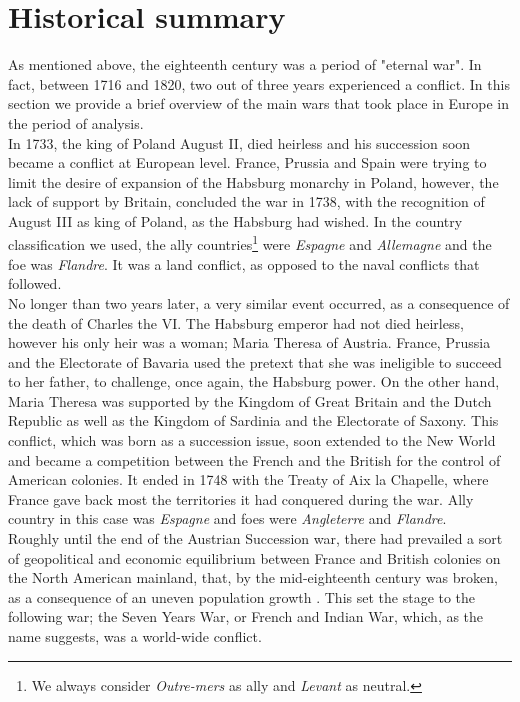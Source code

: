 \documentclass[12pt,a4paper,notitlepage,english]{article}
\begin{document}
\section{Historical summary} \label{historical_summary}
As mentioned above, the eighteenth century was a period of "eternal war".
In fact, between 1716 and 1820, two out of three years experienced a conflict.
In this section we provide a brief overview of the main wars that took place in Europe in the period of analysis. \\
In 1733, the king of Poland August II, died heirless and his succession soon became a conflict at European level.
France, Prussia and Spain were trying to limit the desire of expansion of the Habsburg monarchy in Poland, however, the lack of support by Britain, concluded the war in 1738, with the recognition of August III as king of Poland, as the Habsburg had wished.
In the country classification we used, the ally countries\footnote{We always consider \textit{Outre-mers} as ally and \textit{Levant} as neutral.} were \textit{Espagne} and \textit{Allemagne} and the foe was \textit{Flandre}.
It was a land conflict, as opposed to the naval conflicts that followed. \\
No longer than two years later, a very similar event occurred, as a consequence of the death of Charles the VI.
The Habsburg emperor had not died heirless, however his only heir was a woman; Maria Theresa of Austria.
France, Prussia and the Electorate of Bavaria used the pretext that she was ineligible to succeed to her father, to challenge, once again, the Habsburg power.
On the other hand, Maria Theresa was supported by the Kingdom of Great Britain and the Dutch Republic as well as the Kingdom of Sardinia and the Electorate of Saxony.
This conflict, which was born as a succession issue, soon extended to the New World and became a competition between the French and the British for the control of American colonies.
It ended in 1748 with the Treaty of Aix la Chapelle, where France gave back most the territories it had conquered during the war.
Ally country in this case was \textit{Espagne} and foes were \textit{Angleterre} and \textit{Flandre}. \\
Roughly until the end of the Austrian Succession war, there had prevailed a sort of geopolitical and economic equilibrium between France and British colonies on the North American mainland, that, by the mid-eighteenth century was broken, as a consequence of an uneven population growth \citep{findlay2009power}.
This set the stage to the following war; the Seven Years War, or French and Indian War, which, as the name suggests, was a world-wide conflict.
\end{document}
